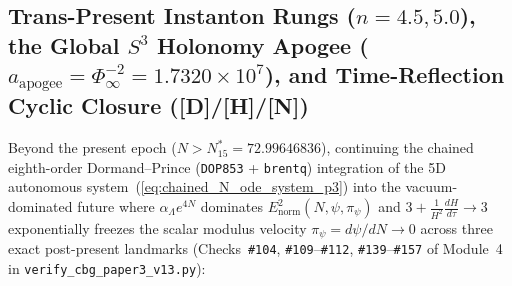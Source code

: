 \documentclass[11pt,a4paper]{article}
\newcommand{\catD}{\textbf{\textcolor{blue!75!black}{[D]}}}
\newcommand{\catH}{\textbf{\textcolor{orange!85!black}{[H]}}}
\newcommand{\catN}{\textbf{\textcolor{teal!75!black}{[N]}}}
\theoremstyle{plain}
\theoremstyle{definition}
\theoremstyle{remark}
\numberwithin{equation}{section}
\begin{document}
\subsection{\texorpdfstring{Trans-Present Instanton Rungs ($n = 4.5, 5.0$), the Global $S^3$ Holonomy Apogee ($a_{\text{apogee}} = \Phi_{\infty}^{-2} = 1.7320 \times 10^7$), and Time-Reflection Cyclic Closure (\catD/\catH/\catN)}{Trans-Present Instanton Rungs (n = 4.5, 5.0), the Global S^3 Holonomy Apogee, and Time-Reflection Cyclic Closure ([D]/[H]/[N])}}

Beyond the present epoch ($N > N_{15}^* = 72.99646836$), continuing the chained eighth-order Dormand--Prince (\texttt{DOP853} + \texttt{brentq}) integration of the 5D autonomous system~(\ref{eq:chained_N_ode_system_p3}) into the vacuum-dominated future where $\alpha_{\Lambda}e^{4N}$ dominates $E_{\text{norm}}^2(N, \psi, \pi_{\psi})$ and $3 + \frac{1}{H^2}\frac{dH}{d\tau} \to 3$ exponentially freezes the scalar modulus velocity $\pi_{\psi} = d\psi/dN \to 0$ across three exact post-present landmarks (Checks~\texttt{\#104}, \texttt{\#109}--\texttt{\#112}, \texttt{\#139}--\texttt{\#157} of Module~4 in \allowbreak\texttt{verify\_cbg\_paper3\_v13.py}):
\end{document}
